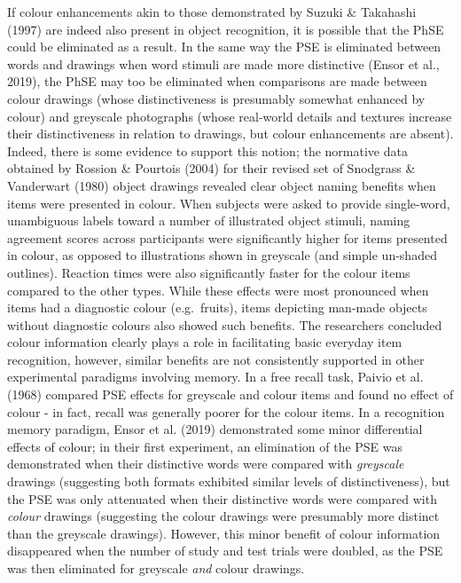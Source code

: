 \documentclass[
  11pt,
]{article}
\begin{document}
If colour enhancements akin to those demonstrated by Suzuki \& Takahashi
(1997) are indeed also present in object recognition, it is possible
that the PhSE could be eliminated as a result. In the same way the PSE
is eliminated between words and drawings when word stimuli are made more
distinctive (Ensor et al., 2019), the PhSE may too be eliminated when
comparisons are made between colour drawings (whose distinctiveness is
presumably somewhat enhanced by colour) and greyscale photographs (whose
real-world details and textures increase their distinctiveness in
relation to drawings, but colour enhancements are absent). Indeed, there
is some evidence to support this notion; the normative data obtained by
Rossion \& Pourtois (2004) for their revised set of Snodgrass \&
Vanderwart (1980) object drawings revealed clear object naming benefits
when items were presented in colour. When subjects were asked to provide
single-word, unambiguous labels toward a number of illustrated object
stimuli, naming agreement scores across participants were significantly
higher for items presented in colour, as opposed to illustrations shown
in greyscale (and simple un-shaded outlines). Reaction times were also
significantly faster for the colour items compared to the other types.
While these effects were most pronounced when items had a diagnostic
colour (e.g.~fruits), items depicting man-made objects without
diagnostic colours also showed such benefits. The researchers concluded
colour information clearly plays a role in facilitating basic everyday
item recognition, however, similar benefits are not consistently
supported in other experimental paradigms involving memory. In a free
recall task, Paivio et al. (1968) compared PSE effects for greyscale and
colour items and found no effect of colour - in fact, recall was
generally poorer for the colour items. In a recognition memory paradigm,
Ensor et al. (2019) demonstrated some minor differential effects of
colour; in their first experiment, an elimination of the PSE was
demonstrated when their distinctive words were compared with
\emph{greyscale} drawings (suggesting both formats exhibited similar
levels of distinctiveness), but the PSE was only attenuated when their
distinctive words were compared with \emph{colour} drawings (suggesting
the colour drawings were presumably more distinct than the greyscale
drawings). However, this minor benefit of colour information disappeared
when the number of study and test trials were doubled, as the PSE was
then eliminated for greyscale \emph{and} colour drawings.
\end{document}
